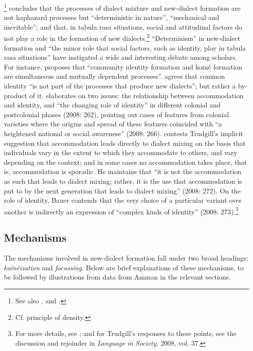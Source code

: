 \documentclass[output=paper]{langsci/langscibook}
\begin{document}
\citet[149]{Trudgill2004}\footnote{See also \citet{TrudgillEtAl2000}, and \citet{Trudgill2008}.} concludes that the processes of dialect mixture and new-dialect formation are not haphazard processes but “deterministic in nature”, “mechanical and inevitable”; and that, in tabula rasa situations, social and attitudinal factors do not play a role in the formation of new dialects.\footnote{Cf.  principle of density.} “Determinism” in new-dialect formation and “the minor role that social factors, such as identity, play in tabula rasa situations” have instigated a wide and interesting debate among scholars. For instance, \citet[261]{Tuten2008} proposes that “community identity formation and koiné formation are simultaneous and mutually dependent processes”. \citet[258]{Mufwene2008} agrees that common identity “is not part of the processes that produce new dialects”; but rather a by-product of it. \citet{Schneider2008} elaborates on two issues: the relationship between accommodation and identity, and “the changing role of identity” in different colonial and postcolonial phases (2008: 262), pointing out cases of features from colonial varieties where the origins and spread of these features coincided with “a heightened national or social awareness” (2008: 266). \citet{Bauer2008} contests Trudgill’s implicit suggestion that accommodation leads directly to dialect mixing on the basis that individuals vary in the extent to which they accommodate to others, and vary depending on the context; and in some cases no accommodation takes place, that is, accommodation is sporadic. He maintains that “it is not the accommodation as such that leads to dialect mixing; rather, it is the use that accommodation is put to by the next generation that leads to dialect mixing” (2008: 272). On the role of identity, Bauer contends that the very choice of a particular variant over another is indirectly an expression of “complex kinds of identity” (2008: 273).\footnote{For more details, see \citet{Bauer2008}; and for Trudgill’s responses to these points, see the discussion and rejoinder in \textit{Language} \textit{in} \textit{Society,} 2008, vol. 37.}

\subsection{Mechanisms}

The mechanisms involved in new-dialect formation fall under two broad headings: \textit{koinéization} and \textit{focussing}. Below are brief explanations of these mechanisms, to be followed by illustrations from data from Amman in the relevant sections.
\end{document}
